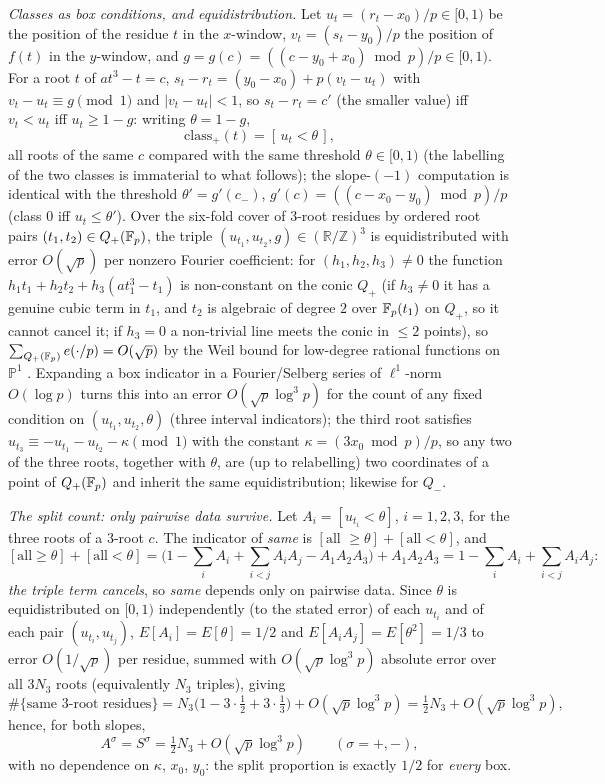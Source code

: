 \smallskip\noindent\emph{Classes as box conditions, and equidistribution.} Let $u_t=(r_t-x_0)/p\in[0,1)$ be the
position of the residue $t$ in the $x$-window, $v_t=(s_t-y_0)/p$ the position of $f(t)$ in the $y$-window, and
$g=g(c)=((c-y_0+x_0)\bmod p)/p\in[0,1)$. For a root $t$ of $at^3-t=c$, $s_t-r_t=(y_0-x_0)+p(v_t-u_t)$ with
$v_t-u_t\equiv g\pmod1$ and $|v_t-u_t|<1$, so $s_t-r_t=c'$ (the smaller value) iff $v_t<u_t$ iff $u_t\ge1-g$:
writing $\theta=1-g$,
\[
\mathrm{class}_+(t)=[\,u_t<\theta\,],
\]
all roots of the same $c$ compared with the same threshold $\theta\in[0,1)$ (the labelling of the two classes is
immaterial to what follows); the slope-$(-1)$ computation is identical with the threshold $\theta'=g'(c_-)$,
$g'(c)=((c-x_0-y_0)\bmod p)/p$ (class $0$ iff $u_t\le\theta'$). Over the six-fold cover of $3$-root residues by ordered
root pairs $(t_1,t_2)\in Q_+(\mathbb{F}_p)$, the triple $(u_{t_1},u_{t_2},g)\in(\mathbb R/\mathbb Z)^3$ is equidistributed
with error $O(\sqrt p)$ per nonzero Fourier coefficient: for $(h_1,h_2,h_3)\ne0$ the function
$h_1t_1+h_2t_2+h_3(at_1^3-t_1)$ is non-constant on the conic $Q_+$ (if $h_3\ne0$ it has a genuine cubic term in
$t_1$, and $t_2$ is algebraic of degree $2$ over $\mathbb{F}_p(t_1)$ on $Q_+$, so it cannot cancel it; if $h_3=0$ a
non-trivial line meets the conic in $\le2$ points), so $\sum_{Q_+(\mathbb{F}_p)}e(\cdot/p)=O(\sqrt p)$ by the Weil bound for
low-degree rational functions on $\mathbb P^1$ \cite{IK}. Expanding a box indicator in a Fourier/Selberg series of
$\ell^1$-norm $O(\log p)$ \cite{Montgomery,Vaaler} turns this into an error $O(\sqrt p\log^3p)$ for the count of any
fixed condition on $(u_{t_1},u_{t_2},\theta)$ (three interval indicators); the third root satisfies
$u_{t_3}\equiv-u_{t_1}-u_{t_2}-\kappa\pmod1$ with the constant $\kappa=(3x_0\bmod p)/p$, so any two of the three
roots, together with $\theta$, are (up to relabelling) two coordinates of a point of $Q_+(\mathbb{F}_p)$ and inherit the same
equidistribution; likewise for $Q_-$.

\smallskip\noindent\emph{The split count: only pairwise data survive.} Let $A_i=[u_{t_i}<\theta]$, $i=1,2,3$, for the
three roots of a $3$-root $c$. The indicator of \emph{same} is $[\text{all }\ge\theta]+[\text{all}<\theta]$, and
\[
[\text{all}\ge\theta]+[\text{all}<\theta]=\bigl(1-\textstyle\sum_iA_i+\sum_{i<j}A_iA_j-A_1A_2A_3\bigr)+A_1A_2A_3
=1-\sum_iA_i+\sum_{i<j}A_iA_j:
\]
\emph{the triple term cancels}, so \emph{same} depends only on pairwise data. Since $\theta$ is equidistributed on
$[0,1)$ independently (to the stated error) of each $u_{t_i}$ and of each pair $(u_{t_i},u_{t_j})$, $E[A_i]=E[\theta]=1/2$
and $E[A_iA_j]=E[\theta^2]=1/3$ to error $O(1/\sqrt p)$ per residue, summed with $O(\sqrt p\log^3p)$ absolute error over
all $3N_3$ roots (equivalently $N_3$ triples), giving
\[
\#\{\text{same }3\text{-root residues}\}=N_3\bigl(1-3\cdot\tfrac12+3\cdot\tfrac13\bigr)+O(\sqrt p\log^3p)=\tfrac12N_3+O(\sqrt p\log^3p),
\]
hence, for both slopes,
\begin{equation}\label{eq:AS}
A^\sigma=S^\sigma=\tfrac12N_3+O(\sqrt p\log^3p)\qquad(\sigma=+,-),
\end{equation}
with no dependence on $\kappa$, $x_0$, $y_0$: the split proportion is exactly $1/2$ for \emph{every} box.

